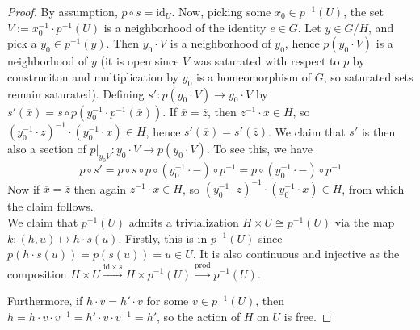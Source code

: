 \documentclass[reqno]{amsart}
\theoremstyle{definition}
\theoremstyle{remark}
\newcommand{\id}{{\mathrm{id}}}
\begin{document}
\begin{proof}
    By assumption, $p \circ s = \id_U$. 
    Now, picking some $x_0 \in p^{-1}(U)$, the set
    $V:= x_0^{-1} \cdot p^{-1}(U)$ is a neighborhood
    of the identity $e \in G$.
    Let $y \in G / H$, and pick a
    $y_0 \in p^{-1}(y)$. Then
    $y_0 \cdot V$ is a neighborhood of $y_0$, hence
    $p(y_0 \cdot V)$ is a neighborhood of $y$ (it is open
    since $V$ was saturated with respect to $p$ by construciton
    and multiplication by $y_0$ is a homeomorphism of $G$, so
    saturated sets remain saturated).
    Defining
    $s' \colon p(y_0\cdot V) \to 
    y_0 \cdot V $ by
    $s'(\overline{x}) = s \circ p \left( y_0^{-1} \cdot 
    p^{-1}(\overline{x}) \right)  $.
    If $\overline{x} = \overline{z}$, then
    $z^{-1} \cdot x \in H$, so
    $\left( y_0^{-1} \cdot z \right)^{-1} \cdot 
    \left( y_0^{-1} \cdot x \right) \in H$, hence
    $s'\left( \overline{x} \right) 
    = s'\left( \overline{z} \right)$.
    We claim that $s'$ is then also a section
    of $p |_{y_0 V} \colon y_0\cdot 
    V \to p\left( y_0 \cdot V \right) $.
    To see this, we have
    \[
    p \circ s' = 
    p \circ s \circ p \circ \left( y_0^{-1} \cdot - \right) 
    \circ p^{-1}
    = p \circ \left( y_0^{-1} \cdot - \right) \circ
    p^{-1}
    \] 
    Now if $\overline{x} = \overline{z}$ then
    again  $z^{-1}\cdot  x \in H$, so
    $\left( y_0^{-1} \cdot z \right)^{-1} \cdot 
    \left( y_0^{-1} \cdot x \right) \in H$, from which
    the claim follows.\\

    We claim that
    $p^{-1}(U)$ admits a trivialization
    $H \times U \cong p^{-1}(U)$ via the map
    $k \colon 
    \left( h,u \right) \mapsto h \cdot s(u)$. Firstly, this
    is in $p^{-1}(U)$ since
    $p\left( h\cdot s(u) \right) = 
    p\left( s (u) \right) = u \in U$. It is also continuous
    and injective
    as the composition
    $H \times U \stackrel{\id \times s}{\to} 
    H \times p^{-1}(U) \stackrel{\text{prod}}{\to} 
    p^{-1}(U)$.

    Furthermore, if
    $h\cdot v = h' \cdot v$ for some
    $v \in p^{-1}(U)$, then
    $h = h \cdot v \cdot v^{-1} = 
    h' \cdot v \cdot v^{-1} = h'$, so
    the action of $H$ on $U$ is free.


\end{proof}
\end{document}
